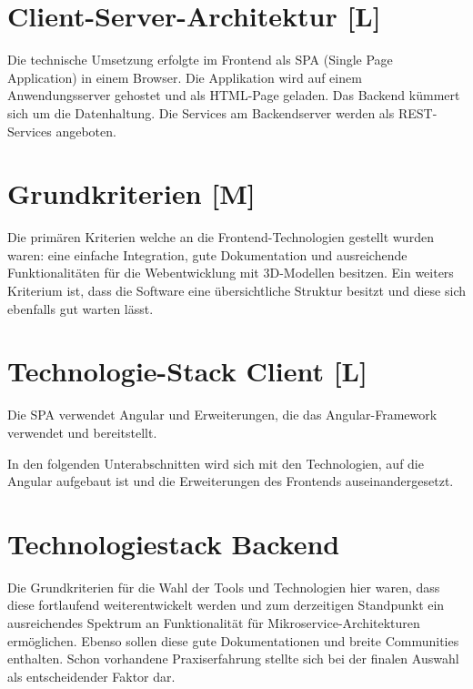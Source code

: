 \section{Client-Server-Architektur [L]}
Die technische Umsetzung erfolgte im Frontend als SPA (Single Page Application) in einem Browser. Die Applikation wird auf einem Anwendungsserver gehostet und als HTML-Page geladen. Das Backend kümmert sich um die Datenhaltung. Die Services am Backendserver werden als REST-Services angeboten.

\section{Grundkriterien [M]} 
Die primären Kriterien welche an die Frontend-Technologien gestellt wurden waren: eine einfache Integration, gute Dokumentation und ausreichende Funktionalitäten für die Webentwicklung mit 3D-Modellen besitzen. Ein weiters Kriterium ist, dass die Software eine übersichtliche Struktur besitzt und diese sich ebenfalls gut warten lässt. 

  

\section{Technologie-Stack Client [L]}
Die SPA verwendet Angular und Erweiterungen, die das Angular-Framework verwendet und bereitstellt.

In den folgenden Unterabschnitten wird sich mit den Technologien, auf die Angular aufgebaut ist und die Erweiterungen des Frontends auseinandergesetzt.





\section{Technologiestack Backend}
Die Grundkriterien für die Wahl der Tools und Technologien hier waren, dass diese fortlaufend weiterentwickelt werden und zum derzeitigen Standpunkt ein ausreichendes Spektrum an Funktionalität für Mikroservice-Architekturen ermöglichen.\cite{MicroserviceAbout} Ebenso sollen diese gute Dokumentationen und breite Communities enthalten. Schon vorhandene Praxiserfahrung stellte sich bei der finalen Auswahl als entscheidender Faktor dar.



